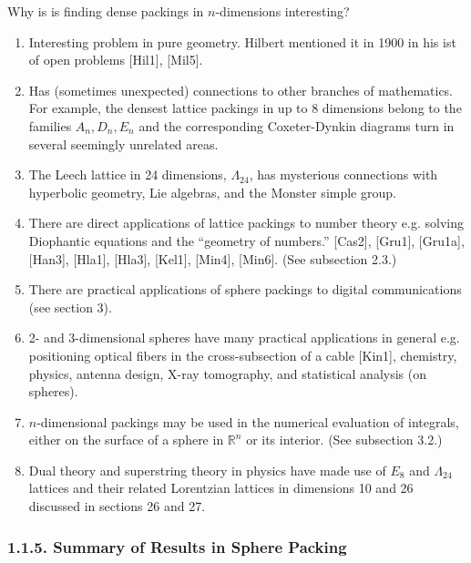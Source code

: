 \documentclass{article}
\newcommand{\R}{\mathbb{R}}
\renewcommand{\=}{\equiv}
\newcommand{\Leech}{\Lambda_{24}}
\begin{document}
Why is is finding dense packings in $n$-dimensions interesting?
\begin{enumerate}
  \item
  Interesting problem in pure geometry.
  Hilbert mentioned it in 1900 in his ist of open problems [Hil1], [Mil5].

  \item
  Has (sometimes unexpected) connections to other branches of mathematics.
  For example, the densest lattice packings in up to 8 dimensions belong to the families $A_n, D_n, E_n$ and the corresponding Coxeter-Dynkin diagrams turn in several seemingly unrelated areas.

  \item
  The Leech lattice in 24 dimensions, $\Leech$, has mysterious connections with hyperbolic geometry, Lie algebras, and the Monster simple group.

  \item
  There are direct applications of lattice packings to number theory e.g. solving Diophantic equations and the ``geometry of numbers.'' [Cas2], [Gru1], [Gru1a], [Han3], [Hla1], [Hla3], [Kel1], [Min4], [Min6].
  (See subsection 2.3.)

  \item
  There are practical applications of sphere packings to digital communications (see section 3).

  \item
  2- and 3-dimensional spheres have many practical applications in general e.g. positioning optical fibers in the cross-subsection of a cable [Kin1], chemistry, physics, antenna design, X-ray tomography, and statistical analysis (on spheres).

  \item
  $n$-dimensional packings may be used in the numerical evaluation of integrals, either on the surface of a sphere in $\R^n$ or its interior. (See subsection 3.2.)

  \item
  Dual theory and superstring theory in physics have made use of $E_8$ and $\Leech$ lattices and their related Lorentzian lattices in dimensions 10 and 26 discussed in sections 26 and 27.

\end{enumerate}

\subsubsection*{1.1.5. Summary of Results in Sphere Packing}
\end{document}
